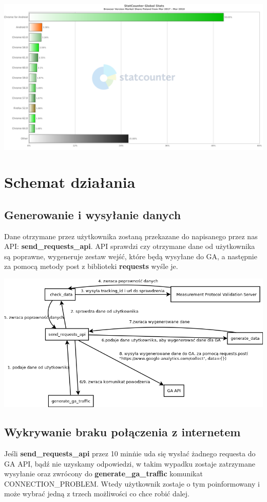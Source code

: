 \documentclass{article}
\begin{document}
\begin{itemize}
\begin{center}\includegraphics[scale=0.3]{chart}\end{center}
\end{itemize}

\section{Schemat działania}

\subsection{Generowanie i wysyłanie danych}
Dane otrzymane przez użytkownika zostaną przekazane do napisanego przez nas API: \textbf{send\_requests\_api}. API sprawdzi czy otrzymane dane od użytkownika są poprawne, wygeneruje zestaw wejść, które będą wysyłane do GA, a następnie za pomocą metody post z biblioteki \textbf{requests} wyśle je. 

\begin{center}\includegraphics[scale=0.5]{connection_ga}\end{center}

\subsection{Wykrywanie braku połączenia z internetem}
Jeśli \textbf{send\_requests\_api} przez 10 min\. nie uda się wysłać żadnego requesta do GA API, bądź nie uzyskamy odpowiedzi, w takim wypadku zostaje zatrzymane wysyłanie oraz zwrócony do \textbf{generate\_ga\_traffic} komunikat CONNECTION\_PROBLEM\@. Wtedy użytkownik zostaje o tym poinformowany i może wybrać jedną z trzech możliwości co chce robić dalej.
\end{document}
